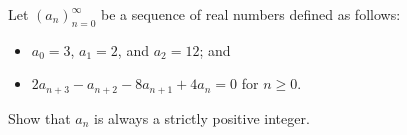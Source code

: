 \documentclass[varwidth]{standalone}
\begin{document}
    Let $(a_n)_{n=0}^{\infty}$ be a sequence of real numbers defined as follows:
    \begin{itemize}
        \item $a_0 = 3$, $a_1 = 2$, and $a_2 = 12$; and
        \item $2a_{n + 3} - a_{n + 2} - 8a_{n + 1} + 4a_n = 0$ for $n \geq 0$.
    \end{itemize}
    Show that $a_n$ is always a strictly positive integer.
\end{document}
